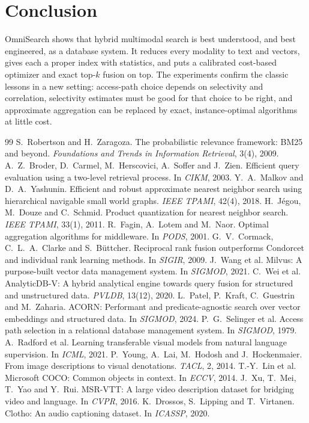 \documentclass[11pt,a4paper]{article}
\begin{document}
\section{Conclusion}

OmniSearch shows that hybrid multimodal search is best understood, and best engineered, as a database
system. It reduces every modality to text and vectors, gives each a proper index with statistics, and
puts a calibrated cost-based optimizer and exact top-$k$ fusion on top. The experiments confirm the
classic lessons in a new setting: access-path choice depends on selectivity and correlation, selectivity
estimates must be good for that choice to be right, and approximate aggregation can be replaced by
exact, instance-optimal algorithms at little cost.

\begin{thebibliography}{99}
\small
{} S.~Robertson and H.~Zaragoza. The probabilistic relevance framework: BM25 and beyond.
  \emph{Foundations and Trends in Information Retrieval}, 3(4), 2009.
 A.~Z.~Broder, D.~Carmel, M.~Herscovici, A.~Soffer and J.~Zien. Efficient query evaluation
  using a two-level retrieval process. In \emph{CIKM}, 2003.
 Y.~A.~Malkov and D.~A.~Yashunin. Efficient and robust approximate nearest neighbor search
  using hierarchical navigable small world graphs. \emph{IEEE TPAMI}, 42(4), 2018.
 H.~J\'egou, M.~Douze and C.~Schmid. Product quantization for nearest neighbor search.
  \emph{IEEE TPAMI}, 33(1), 2011.
 R.~Fagin, A.~Lotem and M.~Naor. Optimal aggregation algorithms for middleware. In
  \emph{PODS}, 2001.
 G.~V.~Cormack, C.~L.~A.~Clarke and S.~B\"uttcher. Reciprocal rank fusion outperforms
  Condorcet and individual rank learning methods. In \emph{SIGIR}, 2009.
 J.~Wang et al. Milvus: A purpose-built vector data management system. In
  \emph{SIGMOD}, 2021.
 C.~Wei et al. AnalyticDB-V: A hybrid analytical engine towards query fusion for
  structured and unstructured data. \emph{PVLDB}, 13(12), 2020.
 L.~Patel, P.~Kraft, C.~Guestrin and M.~Zaharia. ACORN: Performant and
  predicate-agnostic search over vector embeddings and structured data. In \emph{SIGMOD}, 2024.
 P.~G.~Selinger et al. Access path selection in a relational database management
  system. In \emph{SIGMOD}, 1979.
 A.~Radford et al. Learning transferable visual models from natural language
  supervision. In \emph{ICML}, 2021.
 P.~Young, A.~Lai, M.~Hodosh and J.~Hockenmaier. From image descriptions to visual
  denotations. \emph{TACL}, 2, 2014.
 T.-Y.~Lin et al. Microsoft COCO: Common objects in context. In \emph{ECCV}, 2014.
 J.~Xu, T.~Mei, T.~Yao and Y.~Rui. MSR-VTT: A large video description dataset for
  bridging video and language. In \emph{CVPR}, 2016.
 K.~Drossos, S.~Lipping and T.~Virtanen. Clotho: An audio captioning dataset. In
  \emph{ICASSP}, 2020.
\end{thebibliography}
\end{document}
